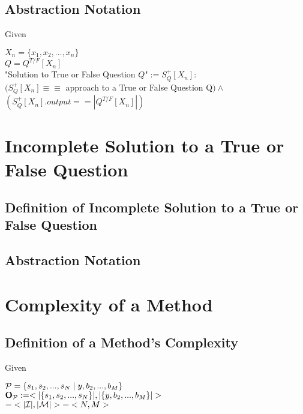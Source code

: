 \documentclass[11pt]{article}
\begin{document}
\subsection{Abstraction Notation}
Given
\begin{center}
$
X_n = \{x_1,x_2,...,x_n\}
$
\\ \vspace{2mm}
$
Q = Q^{T/F}[X_n]
$
\\ \vspace{6mm}
"Solution to True or False Question $Q$"$ := S^+_{Q}[X_n] :
$
\\ \vspace{2mm}
$
(S^+_{Q}[X_n] \equiv \equiv$ approach to a True or False Question Q$)\land
$
\\ \vspace{2mm}
$
(S^+_{Q}[X_n].output == |Q^{T/F}[X_n]|)
$
\end{center}




\section*{Incomplete Solution to a True or False Question}
\subsection{Definition of Incomplete Solution to a True or False Question}
\subsection{Abstraction Notation}











\newpage

\section{Complexity of a Method}

\subsection{Definition of a Method's Complexity}
Given
\begin{center}
$
\mathcal{P} =\{ s_1,s_2,...,s_{N}\hspace{1mm}|\hspace{1mm} y, b_2,...,b_M\} 
$
\\ \vspace{6mm}
$
\bold{O}_{\mathcal{P}} := <|\{s_1,s_2,...,s_{N}\}|,|\{y, b_2,...,b_M\}|>
$
\\ \vspace{2mm}
$
= \hspace{1mm}<|\mathcal{I}|,|\mathcal{M}|>\hspace{1mm} = \hspace{1mm} <N,M>
$
\end{center}
\end{document}
